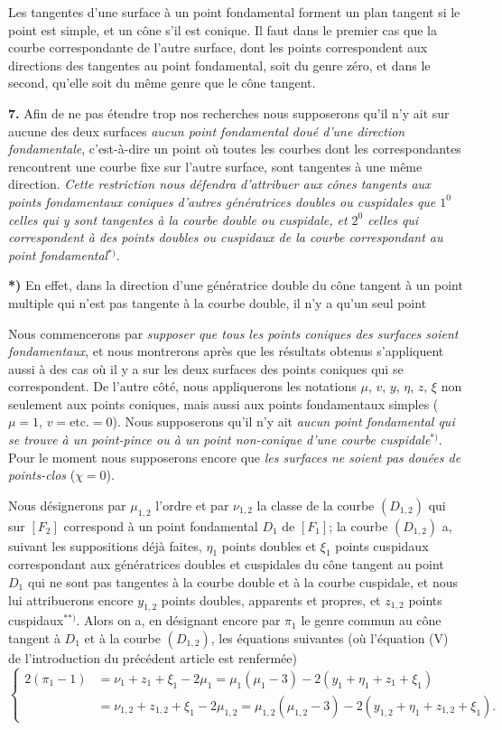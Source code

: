 \documentclass{article}
\begin{document}
Les tangentes d'une surface à un point fondamental forment un plan tangent si le point est simple, et un cône s'il est conique. Il faut dans le premier cas que la courbe correspondante de l'autre surface, dont les points correspondent aux directions des tangentes au point fondamental, soit du genre zéro, et dans le second, qu'elle soit du même genre que le cône tangent.

\textbf{7.} Afin de ne pas étendre trop nos recherches nous supposerons qu'il n'y ait sur aucune des deux surfaces \emph{aucun point fondamental doué d'une direction fondamentale}, c'est-à-dire un point où toutes les courbes dont les correspondantes rencontrent une courbe fixe sur l'autre surface, sont tangentes à une même direction. \emph{Cette restriction nous défendra d'attribuer aux cônes tangents aux points fondamentaux coniques d'autres génératrices doubles ou cuspidales que $1^0$ celles qui y sont tangentes à la courbe double ou cuspidale, et $2^0$ celles qui correspondent à des points doubles ou cuspidaux de la courbe correspondant au point fondamental}${}^{*)}$.

\textbf{*)} En effet, dans la direction d'une génératrice double du cône tangent à un point multiple qui n'est pas tangente à la courbe double, il n'y a qu'un seul point

Nous commencerons par \emph{supposer que tous les points coniques des surfaces soient fondamentaux}, et nous montrerons après que les résultats obtenus s'appliquent aussi à des cas où il y a sur les deux surfaces des points coniques qui se correspondent. De l'autre côté, nous appliquerons les notations $\mu$, $v$, $y$, $\eta$, $z$, $\xi$ non seulement aux points coniques, mais aussi aux points fondamentaux simples ($\mu = 1$, $v = \text{etc.} = 0$). Nous supposerons qu'il n'y ait \emph{aucun point fondamental qui se trouve à un point-pince ou à un point non-conique d'une courbe cuspidale}${}^{*)}$. Pour le moment nous supposerons encore que \emph{les surfaces ne soient pas douées de points-clos} ($\chi = 0$).

Nous désignerons par $\mu_{1, 2}$ l'ordre et par $\nu_{1, 2}$ la classe de la courbe $(D_{1, 2})$ qui sur $[F_2]$ correspond à un point fondamental $D_1$ de $[F_1]$; la courbe $(D_{1, 2})$ a, suivant les suppositions déjà faites, $\eta_1$ points doubles et $\xi_1$ points cuspidaux correspondant aux génératrices doubles et cuspidales du cône tangent au point $D_1$ qui ne sont pas tangentes à la courbe double et à la courbe cuspidale, et nous lui attribuerons encore $y_{1, 2}$ points doubles, apparents et propres, et $z_{1, 2}$ points cuspidaux${}^{**)}$. Alors on a, en désignant encore par $\pi_1$ le genre commun au cône tangent à $D_1$ et à la courbe $(D_{1, 2})$, les équations suivantes (où l'équation (V) de l'introduction du précédent article est renfermée)
\[
\left\{
\begin{aligned}
2(\pi_1 - 1) &= \nu_1 + z_1 + \xi_1 - 2\mu_1 = \mu_1(\mu_1 - 3) - 2(y_1 + \eta_1 + z_1 + \xi_1) \\
&= \nu_{1, 2} + z_{1, 2} + \xi_1 - 2\mu_{1, 2} = \mu_{1, 2}(\mu_{1, 2} - 3) - 2(y_{1, 2} + \eta_1 + z_{1, 2} + \xi_1).
\end{aligned}
\right. \tag{2}
\]
\end{document}
